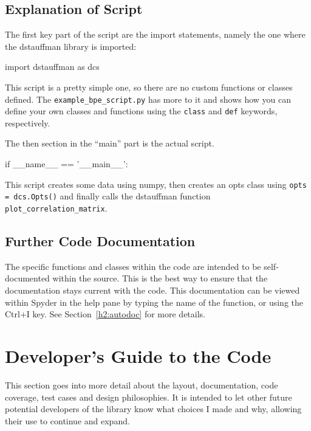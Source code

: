 \documentclass[12pt]{article}
\begin{document}
\subsection{Explanation of Script}\label{h2:Explanation_of_script}
The first key part of the script are the import statements, namely the one where the dstauffman library is imported:
\begin{Python}
    import dstauffman as dcs
\end{Python}

This script is a pretty simple one, so there are no custom functions or classes defined.  The \texttt{example\_bpe\_script.py} has more to it and shows how you can define your own classes and functions using the \texttt{class} and \texttt{def} keywords, respectively.

The then section in the ``main'' part is the actual script.
\begin{Python}
if __name__ == '__main__':
\end{Python}

This script creates some data using numpy, then creates an opts class using \texttt{opts = dcs.Opts()} and finally calls the dstauffman function \texttt{plot\_correlation\_matrix}.

\subsection{Further Code Documentation}\label{h2:Further_code_documentation}
The specific functions and classes within the code are intended to be self-documented within the source.  This is the best way to ensure that the documentation stays current with the code.  This documentation can be viewed within Spyder in the help pane by typing the name of the function, or using the Ctrl+I key.  See Section~\ref{h2:autodoc} for more details.

\pagebreak
\section{Developer's Guide to the Code}\label{h1:Developers_guide}
This section goes into more detail about the layout, documentation, code coverage, test cases and design philosophies.  It is intended to let other future potential developers of the library know what choices I made and why, allowing their use to continue and expand.
\end{document}
